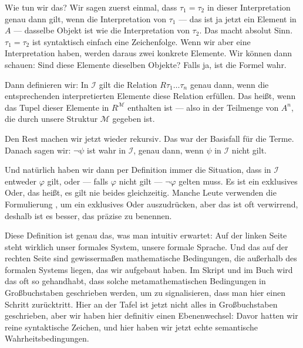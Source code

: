 \begin{spoken-clean}[00:58:03 - 01:00:33]
Wie tun wir das? Wir sagen zuerst einmal, dass $\tau_1 = \tau_2$ in dieser Interpretation genau dann gilt, wenn die Interpretation von $\tau_1$ --- das ist ja jetzt ein Element in $A$ --- dasselbe Objekt ist wie die Interpretation von $\tau_2$. Das macht absolut Sinn. $\tau_1 = \tau_2$ ist syntaktisch einfach eine Zeichenfolge. Wenn wir aber eine Interpretation haben, werden daraus zwei konkrete Elemente. Wir können dann schauen: Sind diese Elemente dieselben Objekte? Falls ja, ist die Formel wahr.

Dann definieren wir: In $\mathcal{I}$ gilt die Relation $R \tau_1 \dots \tau_n$ genau dann, wenn die entsprechenden interpretierten Elemente diese Relation erfüllen. Das heißt, wenn das Tupel dieser Elemente in $R^{\mathcal{M}}$ enthalten ist --- also in der Teilmenge von $A^n$, die durch unsere Struktur $\mathcal{M}$ gegeben ist.

Den Rest machen wir jetzt wieder rekursiv. Das war der Basisfall für die Terme. Danach sagen wir: $\neg \psi$ ist wahr in $\mathcal{I}$, genau dann, wenn $\psi$ in $\mathcal{I}$ nicht gilt.
\end{spoken-clean}

\begin{spoken-clean}[01:00:33 - 01:04:03]
Und natürlich haben wir dann per Definition immer die Situation, dass in $\mathcal{I}$ entweder $\varphi$ gilt, oder --- falls $\varphi$ nicht gilt --- $\neg \varphi$ gelten muss. Es ist ein exklusives Oder, das heißt, es gilt nie beides gleichzeitig. Manche Leute verwenden die Formulierung , um ein exklusives Oder auszudrücken, aber das ist oft verwirrend, deshalb ist es besser, das präzise zu benennen.

Diese Definition ist genau das, was man intuitiv erwartet: Auf der linken Seite steht wirklich unser formales System, unsere formale Sprache. Und das auf der rechten Seite sind gewissermaßen mathematische Bedingungen, die außerhalb des formalen Systems liegen, das wir aufgebaut haben. Im Skript und im Buch wird das oft so gehandhabt, dass solche metamathematischen Bedingungen in Großbuchstaben geschrieben werden, um zu signalisieren, dass man hier einen Schritt zurücktritt. Hier an der Tafel ist jetzt nicht alles in Großbuchstaben geschrieben, aber wir haben hier definitiv einen Ebenenwechsel: Davor hatten wir reine syntaktische Zeichen, und hier haben wir jetzt echte semantische Wahrheitsbedingungen.
\end{spoken-clean}

